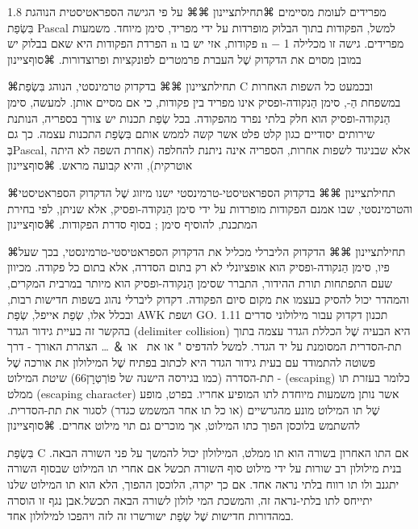         1.8 מפרידים לעומת מסיימים
        ⌘תחילת{ציינון}
        ⌘⌘ על פי הגישה הספראטיסטית הנוהגת בִּשְׂפַת Pascal למשל, הפקודות בתוך הבלוק מופרדות על ידי מפריד, סימן מיוחד. משמעות הפרדת הפקודות היא שאם בבלוק יש n פקודות, אזי יש בו n − 1 מפרידים.
        גישה זו מכלילה במובן מסוים את הדקדוק שֶׁל העברת פרמטרים לפונקציות ופרוצדורות.
    ⌘סוף{ציינון}

    ⌘תחילת{ציינון}
        ⌘⌘ בדקדוק טרמינסטי, הנוהג בִּשְׂפַת C ובכמעט כל השפות האחרות במשפחת הַ-{}, סימן הַנקודה-ופסיק אינו מפריד בין פקודות, כי אם מסיים אותן. למעשה, סימן הַנקודה-ופסיק הוא חלק בלתי נפרד מהפקודה. בכל שְׂפַת תכנות יש צורך בספריה, הנותנת שירותים יסודיים כגון קלט פלט אשר קשה לממש אותם בִּשְׂפַת התכנות עצמה. כך גם בְּPascal, אלא שבניגוד לשפות אחרות, הספריה אינה ניתנת להחלפה (אחרת השפה לא היתה אוטרקית), והיא קבועה מראש.
      ⌘סוף{ציינון}

      ⌘תחילת{ציינון}
        ⌘⌘ בדקדוק הספראטיסטי-טרמינסטי ישנו מיזוג שֶׁל הדקדוק הספראטיסטי והטרמינסטי, שבו אמנם הפקודות מופרדות על ידי סימן הַנקודה-ופסיק, אלא שניתן, לפי בחירת המתכנת, להוסיף סימן ; בסוף סדרת הפקודות.
      ⌘סוף{ציינון}

      ⌘תחילת{ציינון}
        ⌘⌘ הדקדוק הליברלי מכליל את הדקדוק הספראטיסטי-טרמינסטי, בכך שעל פיו, סימן הַנקודה-ופסיק הוא אופציונלי לא רק בתום הסדרה, אלא בתום כל פקודה.
        מכיוון שעם התפתחות תורת ההידור, התברר שסימן הַנקודה-ופסיק הוא מיותר במרבית המקרים, והמהדר יכול להסיק בעצמו את מקום סיום הפקודה.
        דקדוק ליברלי נהוג בשפות חדישות רבות, ובכלל אלו, שְׂפַת אייפל, שְׂפַת AWK ושפת GO.
        1.11 תכנון דקדוק עבור מילולוני סדרים
        בהקשר זה בעיית גידור הגדר (delimiter collision) היא הבעיה שֶׁל הכללת הגדר עצמה בתוך תת-הסדרית המסומנת על יד הגדר. למשל להדפיס " או את \ או ＆ …
        הצהרת האורך - דרך פשוטה להתמודד עם בעית גידור הגדר היא לכתוב בפתיח שֶׁל המילולון את אורכה שֶׁל תת-הסדרה (כמו בגירסה הישנה של פוֹרְטְרָן66)
        שיטת המילוט - (escaping) כלומר בעזרת תו ממלט (escaping character) אשר נותן משמעות מיוחדת לתו המופיע אחריו. בפרט, מופע שֶׁל תו המילוט מונע מהגרשיים (או כל תו אחר המשמש כגדר) לסגור את תת-הסדרית. להשתמש בלוכסן הפוך כתו המילוט, אך מוכרים גם תוי מילוט אחרים.
    ⌘סוף{ציינון}

        בִּשְׂפַת C אם התו האחרון בשורה הוא תו ממלט, המילולון יכול להמשך על פני השורה הבאה. בנית מילולון רב שורות על ידי מילוט סוף השורה תכשל אם אחרי תו המילוט שבסוף השורה יתגנב ולו תו רווח בלתי נראה אחד. אם כך יקרה, הלוכסן ההפוך, הלא הוא תו המילוט שלנו יתייחס לתו בלתי-נראה זה, והמשכת המי לולון לשורה הבאה תכשל.אבן נגף זו הוסרה במהדורות חדישות שֶׁל שְׂפַת ישורשרו זה לזה ויהפכו למילולון אחד.

